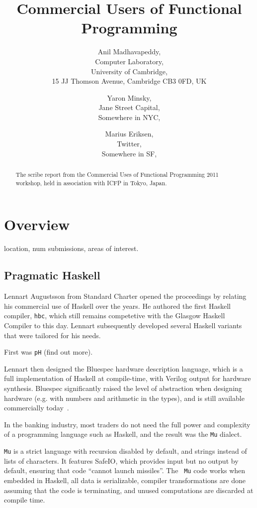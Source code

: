 \documentclass{jfp1}
\title[Commercial Users of Functional Programming 2011]{Commercial Users of Functional Programming}
\author[Anil Madhavapeddy]
       {Anil Madhavapeddy,\\
        Computer Laboratory,\\
        University of Cambridge,\\ 
        15 JJ Thomson Avenue, Cambridge CB3 0FD, UK\\
        \email{avsm2@cl.cam.ac.uk}}
\author[Yaron Minsky]
       {Yaron Minsky,\\
        Jane Street Capital,\\
        Somewhere in NYC,\\ 
        \email{yminsky@gmail.com}}
\author[Marius Eriksen]
       {Marius Eriksen,\\
        Twitter,\\
        Somewhere in SF,\\ 
        \email{marius@twitter.com}}
\begin{document}
\label{firstpage}

\maketitle

\begin{abstract}
The scribe report from the Commercial Uses of Functional Programming 2011 workshop, held in association with ICFP in Tokyo, Japan.
\end{abstract}


\section{Overview}

location, num submissions, areas of interest.

\subsection{Pragmatic Haskell}

Lennart Augustsson from Standard Charter opened the proceedings by relating his
commercial use of Haskell over the years. He authored the first Haskell
compiler, {\tt hbc}, which still remains competetive with the Glasgow Haskell
Compiler to this day.  Lennart subsequently developed several Haskell variants
that were tailored for
his needs.

First was {\tt pH} (find out more).

Lennart then designed the Bluespec hardware description language, which is a
full implementation of Haskell at compile-time, with Verilog output for
hardware synthesis. Bluespec significantly raised the level of abstraction when
designing hardware (e.g. with numbers and arithmetic in the types), and is
still available commercially today~\cite{bluespec}.

In the banking industry, most traders do not need the full power and complexity
of a programming language such as Haskell, and the result was the {\tt Mu}
dialect.

{\tt Mu} is a strict language with recursion disabled by default, and strings
instead of lists of characters.  It features SafeIO, which provides input but
no output by default, ensuring that code ``cannot launch missiles''. The {\tt
Mu} code works when embedded in Haskell, all data is serializable, compiler
transformations are done assuming that the code is terminating, and unused
computations are discarded at compile time.
\end{document}
